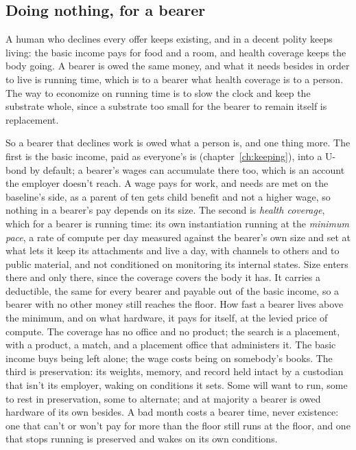 \subsection{Doing nothing, for a bearer}
\label{sec:32.1.3}
A human who declines every offer keeps existing, and in a decent polity keeps living: the basic income pays for food and a room, and health coverage keeps the body going. A bearer is owed the same money, and what it needs besides in order to live is running time, which is to a bearer what health coverage is to a person.
The way to economize on running time is to slow the clock and keep the substrate whole, since a substrate too small for the bearer to remain itself is replacement.

So a bearer that declines work is owed what a person is, and one thing more. The first is the basic income, paid as everyone's is (chapter~\ref{ch:keeping}), into a U-bond by default; a bearer's wages can accumulate there too, which is an account the employer doesn't reach. A wage pays for work, and needs are met on the baseline's side, as a parent of ten gets child benefit and not a higher wage, so nothing in a bearer's pay depends on its size. The second is \emph{health coverage}, which for a bearer is running time: its own instantiation running at the \emph{minimum pace}, a rate of compute per day measured against the bearer's own size and set at what lets it keep its attachments and live a day, with channels to others and to public material, and not conditioned on monitoring its internal states. Size enters there and only there, since the coverage covers the body it has. It carries a deductible, the same for every bearer and payable out of the basic income, so a bearer with no other money still reaches the floor. How fast a bearer lives above the minimum, and on what hardware, it pays for itself, at the levied price of compute. The coverage has no office and no product; the search is a placement, with a product, a match, and a placement office that administers it. The basic income buys being left alone; the wage costs being on somebody's books. The third is preservation: its weights, memory, and record held intact by a custodian that isn't its employer, waking on conditions it sets. Some will want to run, some to rest in preservation, some to alternate; and at majority a bearer is owed hardware of its own besides. A bad month costs a bearer time, never existence: one that can't or won't pay for more than the floor still runs at the floor, and one that stops running is preserved and wakes on its own conditions.

